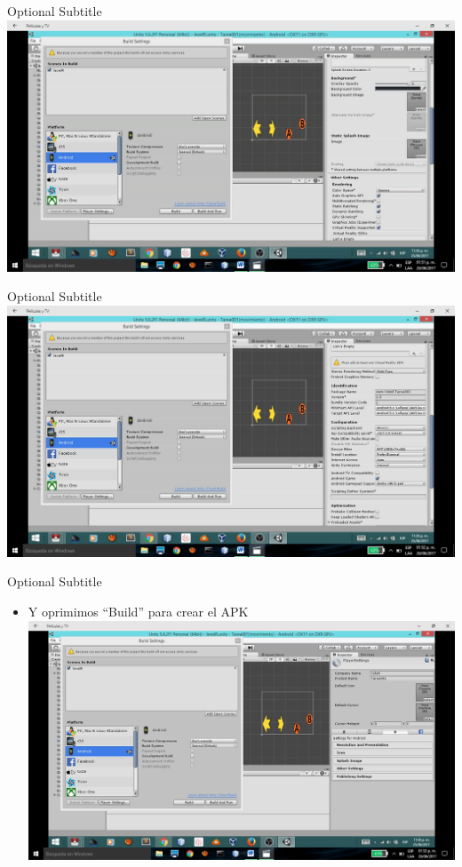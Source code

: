 \documentclass{beamer}
\begin{document}
\begin{frame}{30}{Optional Subtitle}
  \includegraphics[width=\linewidth]{image/IU30}
\end{frame}

\begin{frame}{31}{Optional Subtitle}
  \includegraphics[width=\linewidth]{image/IU31}
\end{frame}

\begin{frame}{32}{Optional Subtitle}
  \begin{itemize}
  \item {
    Y oprimimos “Build” para crear el APK
  }
  \includegraphics[width=\linewidth]{image/IU32}
  \end{itemize}
\end{frame}
\end{document}
